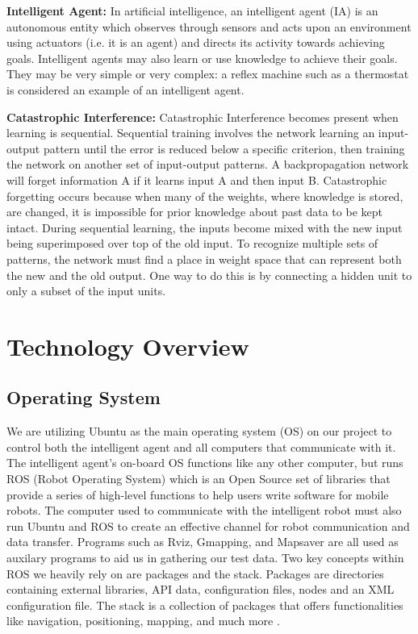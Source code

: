 \documentclass[draftclsnofoot, onecolumn, 10pt, compsoc]{IEEEtran}
\begin{document}
		\noindent\textbf{Intelligent Agent:} In artificial intelligence, an intelligent agent (IA) is an autonomous entity which observes through sensors and acts upon an environment using actuators (i.e. it is an agent) and directs its activity towards achieving goals. Intelligent agents may also learn or use knowledge to achieve their goals. They may be very simple or very complex: a reflex machine such as a thermostat is considered an example of an intelligent agent. \cite{Norvig}
		
		\noindent\textbf{Catastrophic Interference:} Catastrophic Interference becomes present when learning is sequential. Sequential training involves the network learning an input-output pattern until the error is reduced below a specific criterion, then training the network on another set of input-output patterns. A backpropagation network will forget information A if it learns input A and then input B. Catastrophic forgetting occurs because when many of the weights, where knowledge is stored, are changed, it is impossible for prior knowledge about past data to be kept intact. During sequential learning, the inputs become mixed with the new input being superimposed over top of the old input. To recognize multiple sets of patterns, the network must find a place in weight space that can represent both the new and the old output. One way to do this is by connecting a hidden unit to only a subset of the input units. \cite{ImgRecog} \cite{miller}
	
	\section{Technology Overview}
		\subsection{Operating System}
			We are utilizing Ubuntu as the main operating system (OS) on our project to control both the intelligent agent and all computers that communicate with it. The intelligent agent's on-board OS functions like any other computer, but runs ROS (Robot Operating System) which is an Open Source set of libraries that provide a series of high-level functions to help users write software for mobile robots. The computer used to communicate with the intelligent robot must also run Ubuntu and ROS to create an effective channel for robot communication and data transfer. Programs such as Rviz, Gmapping, and Mapsaver are all used as auxilary programs to aid us in gathering our test data. Two key concepts within ROS we heavily rely on are packages and the stack. Packages are directories containing external libraries, API data, configuration files, nodes and an XML configuration file. The stack is a collection of packages that offers functionalities like navigation, positioning, mapping, and much more \cite{ROSintro}.
		
\end{document}
